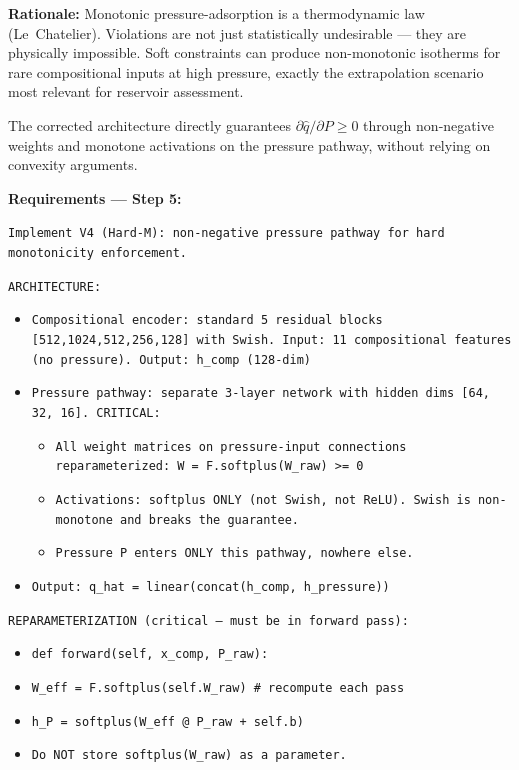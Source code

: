 \documentclass[12pt,a4paper]{article}
\begin{document}
\begin{rationalebox}
\textbf{Rationale:} Monotonic pressure-adsorption is a thermodynamic
law (Le~Chatelier). Violations are not just statistically undesirable
--- they are physically impossible. Soft constraints can produce
non-monotonic isotherms for rare compositional inputs at high pressure,
exactly the extrapolation scenario most relevant for reservoir assessment.

The corrected architecture directly guarantees $\partial\hat{q}/\partial P \geq 0$
through non-negative weights and monotone activations on the pressure
pathway, without relying on convexity arguments.
\end{rationalebox}

\begin{promptbox}
\textbf{Requirements --- Step 5:}

\texttt{Implement V4 (Hard-M): non-negative pressure pathway for hard
monotonicity enforcement.}

\texttt{ARCHITECTURE:}
\begin{itemize}[noitemsep]
  \item \texttt{Compositional encoder: standard 5 residual blocks
    [512,1024,512,256,128] with Swish. Input: 11 compositional features
    (no pressure). Output: h\_comp (128-dim)}
  \item \texttt{Pressure pathway: separate 3-layer network with
    hidden dims [64, 32, 16]. CRITICAL:}
  \begin{itemize}[noitemsep]
    \item \texttt{All weight matrices on pressure-input connections
      reparameterized: W = F.softplus(W\_raw) >= 0}
    \item \texttt{Activations: softplus ONLY (not Swish, not ReLU).
      Swish is non-monotone and breaks the guarantee.}
    \item \texttt{Pressure P enters ONLY this pathway, nowhere else.}
  \end{itemize}
  \item \texttt{Output: q\_hat = linear(concat(h\_comp, h\_pressure))}
\end{itemize}

\texttt{REPARAMETERIZATION (critical --- must be in forward pass):}
\begin{itemize}[noitemsep]
  \item \texttt{def forward(self, x\_comp, P\_raw):}
  \item \texttt{W\_eff = F.softplus(self.W\_raw) \# recompute each pass}
  \item \texttt{h\_P = softplus(W\_eff @ P\_raw + self.b)}
  \item \texttt{Do NOT store softplus(W\_raw) as a parameter.}
\end{itemize}


\end{promptbox}
\end{document}

